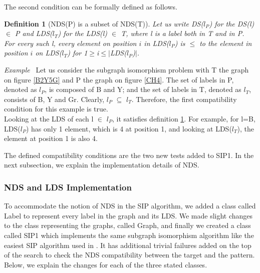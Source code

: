 \documentclass{l4proj}
\newcounter{example}[section]
\newenvironment{example}[1][]{\refstepcounter{example}\par\medskip
   \noindent \textit{Example~\theexample #1} \rmfamily}{\medskip}
\newtheorem{definition}{Definition}
\begin{document}
The second condition can be formally defined as follows.

\begin{definition}[NDS(P) is a subset of NDS(T)]
\label{ndsPsubsetndsT}
Let us write DS($l_P$) for the DS(l) $\in$ P and LDS($l_T$) for the LDS(l) $\in$ T, where l is a label both in T and in P. For every such l, every element on position $i$ in LDS($l_P$) is $\leq$ to the element in position $i$ on LDS($l_T$) for 1$\geq$i$\leq|$LDS($l_P$)$|$.
\end{definition}

\begin{example}
Let us consider the subgraph isomorphism problem with T the graph on figure \ref{B2Y5G} and P the graph on figure \ref{CH4}. The set of labels in P, denoted as $l_P$, is composed of B and Y; and the set of labels in T, denoted as $l_T$, consists of B, Y and Gr. Clearly, $l_P$ $\subseteq$ $l_T$. Therefore, the first compatibility condition for this example is true.\\
Looking at the LDS of each l $\in$ $l_P$, it satisfies definition \ref{ndsPsubsetndsT}. For example, for l=B, LDS($l_P$) has only 1 element, which is 4 at position 1, and looking at LDS($l_T$), the element at position 1 is also 4.
\end{example}

The defined compatibility conditions are the two new tests added to SIP1. In the next subsection, we explain the implementation details of NDS.  

\subsubsection{NDS and LDS Implementation}
To accommodate the notion of NDS in the SIP algorithm, we added a class called Label to represent every label in the graph and its LDS. We made slight changes to the class representing the graphs, called Graph, and finally we created a class called SIP1 which implements the same subgraph isomorphism algorithm like the easiest SIP algorithm used in \cite{CP2015}. It has additional trivial failures added on the top of the search to check the NDS compatibility between the target and the pattern. Below, we explain the changes for each of the three stated classes.
\end{document}
